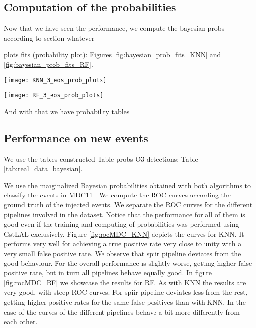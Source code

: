 \subsection{Computation of the probabilities}
Now that we have seen the performance, we compute the bayesian probs according to section whatever

plots fits (probability plot): Figures \ref{fig:bayesian_prob_fits_KNN} and \ref{fig:bayesian_prob_fits_RF}.

\begin{figure*}[h]
\texttt{[image: KNN\_3\_eos\_prob\_plots]}
\caption{\label{fig:bayesian_prob_fits_KNN} .}
\end{figure*}

\begin{figure*}[h]
\texttt{[image: RF\_3\_eos\_prob\_plots]}
\caption{\label{fig:bayesian_prob_fits_RF} .}
\end{figure*}

And with that we have probability tables

\subsection{Performance on new events}
We use the tables constructed 
Table probs O3 detections: Table \ref{tab:real_data_bayesian}.

We use the marginalized Bayesian probabilities obtained with both algorithms to classify the events in MDC11 . We compute the ROC curves according the ground truth of the injected events. We separate the ROC curves for the different pipelines involved in the dataset. Notice that the performance for all of them is good even if the training and computing of probabilities was performed using GstLAL exclusively. Figure \ref{fig:rocMDC_KNN} depicts the curves for KNN. It performs very well for \hasns achieving a true positive rate very close to unity with a very small false positive rate. We observe that spiir pipeline deviates from the good behaviour. For \hasrem the overall performance is slightly worse, getting higher false positive rate, but in turn all pipelines behave equally good. In figure \ref{fig:rocMDC_RF} we showcase the results for \ac{RF}. As with \ac{KNN} the results are very good, with steep ROC curves. For \hasns spiir pipeline deviates less from the rest, getting higher positive rates for the same false positives than with \ac{KNN}. In the case of \hasrem the curves of the different pipelines behave a bit more differently from each other.

